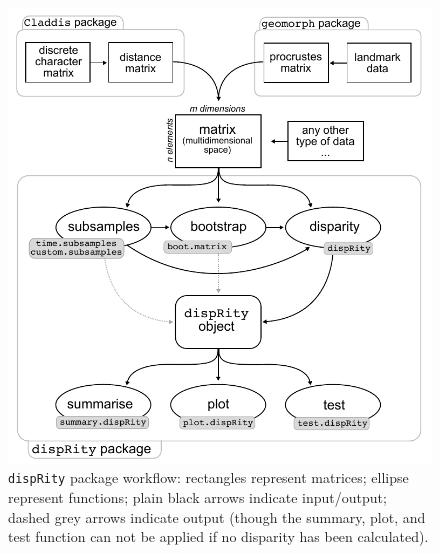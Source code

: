 \documentclass[12pt,letterpaper]{article}
\newcommand{\disp}{\texttt{dispRity} }
\begin{document}
\begin{figure}[!htbp]
\centering
   \includegraphics[width=1\textwidth]{workflowsvg.pdf} 
\caption{\disp package workflow: rectangles represent matrices; ellipse represent functions; plain black arrows indicate input/output; dashed grey arrows indicate output (though the summary, plot, and test function can not be applied if no disparity has been calculated).}
\label{Fig:workflow}
\end{figure}
\end{document}
